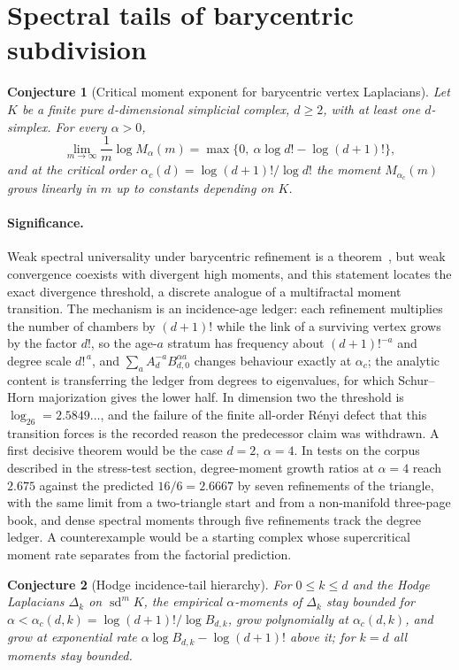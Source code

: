 \documentclass[11pt]{article}
\newtheorem{conjecture}{Conjecture}
\theoremstyle{definition}
\begin{document}
\section{Spectral tails of barycentric subdivision}

\begin{conjecture}[Critical moment exponent for barycentric vertex Laplacians]\label{ac1}
Let $K$ be a finite pure $d$-dimensional simplicial complex, $d\ge2$, with at least one $d$-simplex.  For every $\alpha>0$,
\[
\lim_{m\to\infty}\frac1m\log M_\alpha(m)=\max\{0,\ \alpha\log d!-\log(d+1)!\},
\]
and at the critical order $\alpha_c(d)=\log(d+1)!/\log d!$ the moment $M_{\alpha_c}(m)$ grows linearly in $m$ up to constants depending on $K$.
\end{conjecture}

\paragraph{Significance.}
Weak spectral universality under barycentric refinement is a theorem~\cite{Kn15a,Kn15b}, but weak convergence coexists with divergent high moments, and this statement locates the exact divergence threshold, a discrete analogue of a multifractal moment transition.  The mechanism is an incidence-age ledger: each refinement multiplies the number of chambers by $(d+1)!$ while the link of a surviving vertex grows by the factor $d!$, so the age-$a$ stratum has frequency about $(d+1)!^{-a}$ and degree scale $d!^{\,a}$, and $\sum_a A_d^{-a}B_{d,0}^{\alpha a}$ changes behaviour exactly at $\alpha_c$; the analytic content is transferring the ledger from degrees to eigenvalues, for which Schur--Horn majorization gives the lower half.  In dimension two the threshold is $\log_26=2.5849\ldots$, and the failure of the finite all-order R\'enyi defect that this transition forces is the recorded reason the predecessor claim was withdrawn.  A first decisive theorem would be the case $d=2$, $\alpha=4$.  In tests on the corpus described in the stress-test section, degree-moment growth ratios at $\alpha=4$ reach $2.675$ against the predicted $16/6=2.6667$ by seven refinements of the triangle, with the same limit from a two-triangle start and from a non-manifold three-page book, and dense spectral moments through five refinements track the degree ledger.  A counterexample would be a starting complex whose supercritical moment rate separates from the factorial prediction.

\begin{conjecture}[Hodge incidence-tail hierarchy]\label{ac2}
For $0\le k\le d$ and the Hodge Laplacians $\Delta_k$ on $\operatorname{sd}^mK$, the empirical $\alpha$-moments of $\Delta_k$ stay bounded for $\alpha<\alpha_c(d,k)=\log(d+1)!/\log B_{d,k}$, grow polynomially at $\alpha_c(d,k)$, and grow at exponential rate $\alpha\log B_{d,k}-\log(d+1)!$ above it; for $k=d$ all moments stay bounded.
\end{conjecture}
\end{document}
